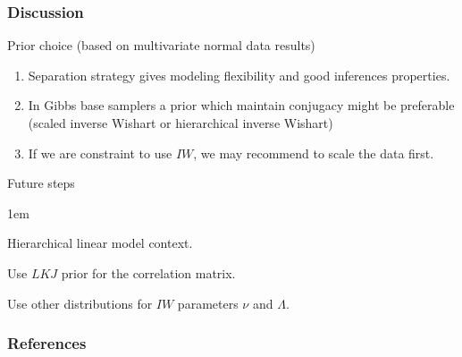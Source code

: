 \documentclass[9pt]{beamer}\usepackage[]{graphicx}\usepackage[]{color}
\begin{document}
\begin{frame}
\frametitle{Discussion}
Prior choice (based on multivariate normal data results)
\begin{enumerate} \itemsep1em
\item Separation strategy  gives modeling flexibility and good inferences properties. \citep{barnard2000}
\item In Gibbs base samplers a prior which maintain conjugacy might be preferable (scaled inverse Wishart or hierarchical inverse Wishart) 
\item If we are constraint to use $IW$, we may recommend to scale the data first.
\end{enumerate}  
\vspace{.5cm}

Future steps
\begin{description} \itemsep1em
\item[Different Model] Hierarchical linear model context. 

\item[Different Priors] Use $LKJ$ prior for the correlation matrix. 

Use other distributions for $IW$ parameters $\nu$ and $\Lambda$.
\end{description}
\end{frame}






\begin{frame}
\frametitle{References}
        
\small{   }
\end{frame}
\end{document}
